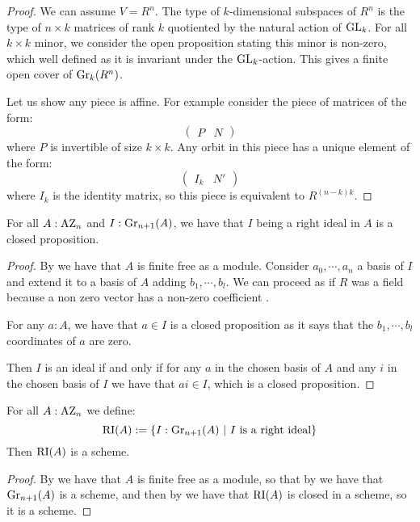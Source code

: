 \begin{proof}
We can assume $V=R^n$. The type of $k$-dimensional subspaces of $R^n$ is the type of $n\times k$ matrices of rank $k$ quotiented by the natural action of $\operatorname{GL}_k$. For all $k\times k$ minor, we consider the open proposition stating this minor is non-zero, which well defined as it is invariant under the $\operatorname{GL}_k$-action. This gives a finite open cover of $\mathrm{Gr}_k(R^n)$.

Let us show any piece is affine. For example consider the piece of matrices of the form:
\[\begin{pmatrix}
P & N
\end{pmatrix}\]
where $P$ is invertible of size $k\times k$. Any orbit in this piece has a unique element of the form:
\[\begin{pmatrix}
I_k & N'
\end{pmatrix}\]
where $I_k$ is the identity matrix, so this piece is equivalent to $R^{(n-k)k}$.
\end{proof}

\begin{lemma}\label{being-ideal-in-azumaya-closed}
For all $A:\mathrm{AZ}_n$ and $I:\mathrm{Gr}_{n+1}(A)$, we have that $I$ being a right ideal in $A$ is a closed proposition.
\end{lemma}

\begin{proof}
By  we have that $A$ is finite free as a module. Consider $a_0,\cdots,a_n$ a basis of $I$ and extend it to a basis of $A$ adding $b_1,\cdots,b_l$. We can proceed as if $R$ was a field because a non zero vector has a non-zero coefficient \cite{draft}.

For any $a:A$, we have that $a\in I$ is a closed proposition as it says that the $b_1,\cdots,b_l$ coordinates of $a$ are zero. 

Then $I$ is an ideal if and only if for any $a$ in the chosen basis of $A$ and any $i$ in the chosen basis of $I$ we have that $ai\in I$, which is a closed proposition.
\end{proof}

\begin{lemma}\label{severi-brauer-are-schemes}
For all $A:\mathrm{AZ}_n$ we define:
\[\RI(A) := \{I:\Gr_{n+1}(A)\ |\ I\ \mathrm{is\ a\ right\ ideal}\}\]
Then $\mathrm{RI}(A)$ is a scheme.
\end{lemma}

\begin{proof}
By  we have that $A$ is finite free as a module, so that by  we have that $\mathrm{Gr}_{n+1}(A)$ is a scheme, and then by  we have that $\mathrm{RI}(A)$ is closed in a scheme, so it is a scheme.
\end{proof}


